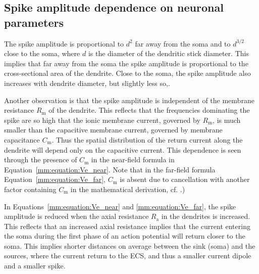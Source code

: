 \subsection{Spike amplitude dependence on neuronal parameters}
The spike amplitude is proportional to $d^{2}$ far away from the soma and to $d^{3/2}$ close to the soma,
where $d$ is the diameter of the dendritic stick diameter. This implies that far away from the soma the spike amplitude is proportional to 
the cross-sectional area of the dendrite. Close to the soma, the spike amplitude also increases with dendrite diameter, but slightly less so,.

Another observation is that the spike amplitude is independent of the membrane resistance $R_\mathrm{m}$ of the dendrite.
This reflects that the frequencies dominating the spike are so high that the ionic membrane current, governed by $R_\mathrm{m}$, is
much smaller than the capacitive membrane current, governed by membrane capacitance $C_\mathrm{m}$.  
Thus the spatial distribution of the return current along the dendrite will depend only on the capacitive current. This dependence
is seen through the presence of  $C_\mathrm{m}$ in the near-field formula in Equation~\ref{mm:equation:Ve_near}. Note that in the far-field formula
Equation~\ref{mm:equation:Ve_far},  $C_\mathrm{m}$ is absent due to cancellation with another factor containing $C_\mathrm{m}$ in the mathematical derivation, 
cf. .)

In Equations~\ref{mm:equation:Ve_near} and \ref{mm:equation:Ve_far}, the spike amplitude is reduced when the 
axial resistance $R_\mathrm{a}$ in the dendrites is increased. This reflects that an increased axial resistance implies that the current entering
the soma during the first phase of an action potential will return closer to the soma. This implies shorter distances on average between the sink (soma) and the sources, where the current return to the ECS, and thus a smaller current dipole and a smaller spike.




